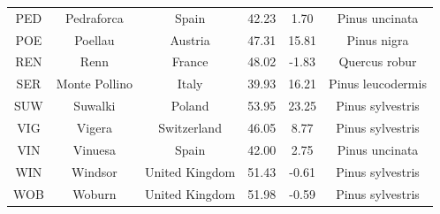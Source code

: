 \documentclass[a4paper,11pt]{article}
\begin{document}
\begin{table}[ht]
\begin{tabular}{|c|c|c|c|c|c|}
		PED & Pedraforca & Spain & 42.23 & 1.70 & Pinus uncinata \\
		POE & Poellau & Austria & 47.31 & 15.81 & Pinus nigra \\
		REN & Renn & France & 48.02 & -1.83 & Quercus robur \\
		SER & Monte Pollino & Italy & 39.93 & 16.21 & Pinus leucodermis \\
		SUW & Suwalki & Poland & 53.95 & 23.25 & Pinus sylvestris \\
		VIG & Vigera & Switzerland & 46.05 & 8.77 & Pinus sylvestris \\
		VIN & Vinuesa & Spain & 42.00 & 2.75 & Pinus uncinata \\
		WIN & Windsor & United Kingdom & 51.43 & -0.61 & Pinus sylvestris \\
		WOB & Woburn & United Kingdom & 51.98 & -0.59 & Pinus sylvestris \\
		\hline
	\end{tabular}
\end{table}

\newpage
\end{document}
